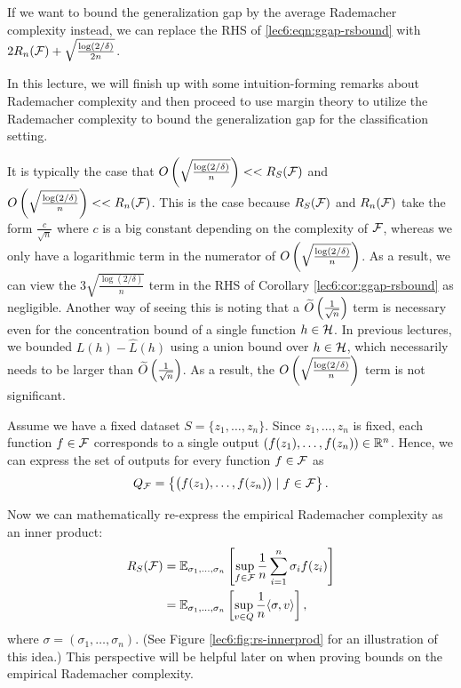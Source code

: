 \begin{remark}
If we want to bound the generalization gap by the average Rademacher complexity instead, we can replace the RHS of \eqref{lec6:eqn:ggap-rsbound} with $2R_n(\mathcal F) + \sqrt{\frac{\log(2/\delta)}{2n}}$.
\end{remark}

In this lecture, we will finish up with some intuition-forming remarks about Rademacher complexity and then proceed to use margin theory to utilize the Rademacher complexity to bound the generalization gap for the classification setting.

It is typically the case that $O\left(\sqrt{\frac{\log (2/\delta)}{n}}\right) << R_S(\mathcal F)$ and $O\left(\sqrt{\frac{\log (2/\delta)}{n}}\right) << R_n(\mathcal F)$. This is the case because $R_S(\mathcal F)$ and $R_n(\mathcal F)$ take the form $\frac{c}{\sqrt{n}}$ where $c$ is a big constant depending on the complexity of $\mathcal F$, whereas we only have a logarithmic term in the numerator of $O\left(\sqrt{\frac{\log (2/\delta)}{n}}\right)$. As a result, we can view the $3\sqrt{\frac{\log (2/\delta)}{n}}$ term in the RHS of Corollary \ref{lec6:cor:ggap-rsbound} as negligible. Another way of seeing this is noting that a $\widetilde{O} \left( \frac{1}{\sqrt{n}} \right)$ term is necessary even for the concentration bound of a single function $h\in\mathcal H$. In previous lectures, we bounded $L(h)-\hat{L}(h)$ using a union bound over $h\in\mathcal H$, which necessarily needs to be larger than $\widetilde{O} \left(\frac{1}{\sqrt{n}} \right)$. As a result, the $O\left(\sqrt{\frac{\log (2/\delta)}{n}}\right)$ term is not significant.

Assume we have a fixed dataset $S = \{z_1, \dots, z_n\}$. Since $z_1,\dots, z_n$ is fixed, each function $f\in\mathcal F$ corresponds to a single output $(f(z_1),\dots,f(z_n))\in \mathbb R^n$. Hence, we can express the set of outputs for every function $f\in\mathcal F$ as
\begin{align}
    Q_\mathcal F = \left\{ \begin{pmatrix}f(z_1), \dots, f(z_n) \end{pmatrix} \mid f\in\mathcal F \right\}.
\end{align}

Now we can mathematically re-express the empirical Rademacher complexity as an inner product:
\begin{align}
R_S(\mathcal F) &= \mathbb{E}_{\sigma_1,\dots, \sigma_n} \left[ \sup_{f\in \mathcal F} \frac{1}{n} \sum^n_{i=1} \sigma_i f(z_i) \right] \\
&= \mathbb{E}_{\sigma_1,\dots, \sigma_n} \left[ \sup_{v\in Q} \frac{1}{n}\langle\sigma, v\rangle \right],
\end{align}
where $\sigma=(\sigma_1,\dots,\sigma_n)$. (See Figure \ref{lec6:fig:rs-innerprod} for an illustration of this idea.) This perspective will be helpful later on when proving bounds on the empirical Rademacher complexity.

